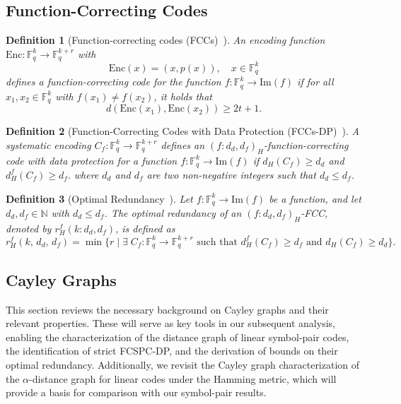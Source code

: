 \documentclass[11pt,draftclsnofoot,journal,onecolumn]{IEEEtran}
\newtheorem{definition}{Definition}
\newcommand{\Img}{\mathrm{Im}}
\begin{document}
   \subsection{Function-Correcting Codes} 
    \begin{definition}[Function-correcting codes (FCCs)~\cite{10132545}]
    \label{def:FCC}
    An encoding function $\mathrm{Enc} : \mathbb{F}_q^k \to \mathbb{F}_q^{k+r}$ with
    \[
    \mathrm{Enc}(x) = (x, p(x)), \quad x \in \mathbb{F}_q^k
    \]
    defines a function-correcting code for the function $f : \mathbb{F}_q^k \to \mathrm{Im}(f)$ if for all $x_1, x_2 \in \mathbb{F}_q^k$ with $f(x_1) \neq f(x_2)$, it holds that
    \[
    d(\mathrm{Enc}(x_1), \mathrm{Enc}(x_2)) \geq 2t + 1.
    \]    
    \end{definition}
    \begin{definition}[Function-Correcting Codes with Data Protection (FCCs-DP)~\cite{rajput2025function}]
    \label{def:FCC-DP}
        A systematic encoding $C_f: \mathbb{F}_q^k \rightarrow \mathbb{F}_q^{k+r}$ defines an $(f: d_d, d_f)_H$-function-correcting code with data protection for a function $f:\mathbb{F}_q^k \rightarrow \Img(f)$  if $d_H(C_f) \geq d_d$ and $d_H^f(C_f) \geq d_f.$
        where $d_d$ and $d_f$ are two non-negative integers such that $d_d \leq d_f$.
    \end{definition}

    \begin{definition}[Optimal Redundancy~\cite{rajput2025function}]
     \label{def: opt_r_H}
     Let $f : \mathbb{F}_q^k \to \mathrm{Im}(f)$ be a function, and let $d_d, d_f \in \mathbb{N}$ with $d_d \leq d_f$. The optimal redundancy of an $(f : d_d, d_f)_H$-FCC, denoted by $r_H^f(k : d_d, d_f)$, is defined as
     \[
        r_H^f(k, \, d_d, \, d_f) = \min\{ r\;| \; \exists \; C_f: \mathbb{F}_q^k \rightarrow\mathbb{F}_q^{k+r} \text{ such that } d_H^f(C_f) \geq d_f \text{ and } d_H(C_f) \geq d_d\}.
     \]
    \end{definition}


    \subsection{Cayley Graphs}

    This section reviews the necessary background on Cayley graphs and their relevant properties. These will serve as key tools in our subsequent analysis, enabling the characterization of the distance graph of linear symbol-pair codes, the identification of strict FCSPC-DP, and the derivation of bounds on their optimal redundancy. Additionally, we revisit the Cayley graph characterization of the $\alpha$-distance graph for linear codes under the Hamming metric, which will provide a basis for comparison with our symbol-pair results.
\end{document}
